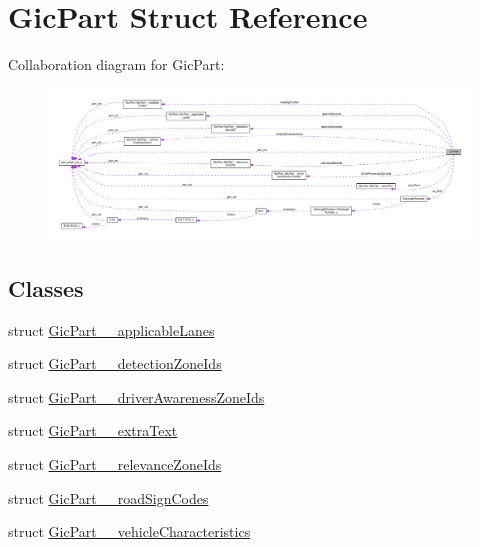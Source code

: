\hypertarget{structGicPart}{}\section{Gic\+Part Struct Reference}
\label{structGicPart}


Collaboration diagram for Gic\+Part\+:\nopagebreak
\begin{figure}[H]
\begin{center}
\leavevmode
\includegraphics[width=350pt]{structGicPart__coll__graph}
\end{center}
\end{figure}
\subsection*{Classes}
\begin{DoxyCompactItemize}
\item 
struct \hyperlink{structGicPart_1_1GicPart____applicableLanes}{Gic\+Part\+\_\+\+\_\+applicable\+Lanes}
\item 
struct \hyperlink{structGicPart_1_1GicPart____detectionZoneIds}{Gic\+Part\+\_\+\+\_\+detection\+Zone\+Ids}
\item 
struct \hyperlink{structGicPart_1_1GicPart____driverAwarenessZoneIds}{Gic\+Part\+\_\+\+\_\+driver\+Awareness\+Zone\+Ids}
\item 
struct \hyperlink{structGicPart_1_1GicPart____extraText}{Gic\+Part\+\_\+\+\_\+extra\+Text}
\item 
struct \hyperlink{structGicPart_1_1GicPart____relevanceZoneIds}{Gic\+Part\+\_\+\+\_\+relevance\+Zone\+Ids}
\item 
struct \hyperlink{structGicPart_1_1GicPart____roadSignCodes}{Gic\+Part\+\_\+\+\_\+road\+Sign\+Codes}
\item 
struct \hyperlink{structGicPart_1_1GicPart____vehicleCharacteristics}{Gic\+Part\+\_\+\+\_\+vehicle\+Characteristics}
\end{DoxyCompactItemize}
